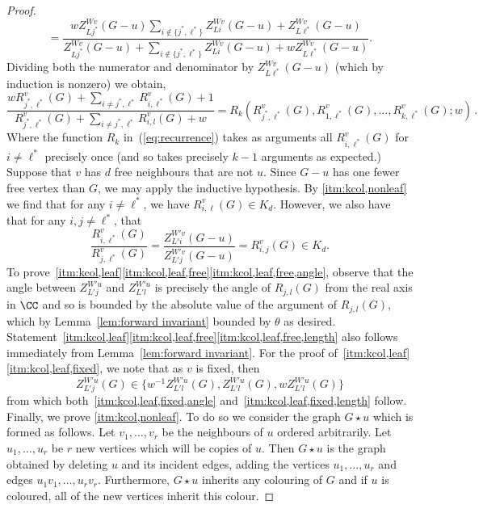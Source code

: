 \begin{proof}
\[ =\frac{wZ^{Wv}_{Lj^*}(G-u)\sum_{i\notin\{ j^*,\ell^*\}}Z^{Wv}_{Li}(G-u)+Z^{Wv}_{L\ell^*}(G-u)}{Z^{Wv}_{Lj^*}(G-u)+\sum_{i\notin\{ j^*,\ell^*\}}Z^{Wv}_{Li}(G-u)+wZ^{Wv}_{L\ell^*}(G-u)}.
 \]
 Dividing both the numerator and denominator by $Z^{Wv}_{L\ell^*}(G-u)$ (which by induction is nonzero) we obtain,
 \begin{equation}
 \dfrac{w R_{j^*,\ell^*}^v(G) + \sum_{i \neq j^*, \ell^*} R_{i,\ell^*}^v(G) +1}{R_{j^*,\ell^*}^v(G) +\sum_{i \neq j^*,\ell^*} R_{i,l}^v(G)+w} = R_k(R_{j^*,\ell^*}^v(G), R_{1,\ell^*}^v(G), \dotsc, R_{k,\ell^*}^v(G);w)\,.
 \label{eq:recurrence}
\end{equation}
Where the function $R_k$ in~(\ref{eq:recurrence}) takes as arguments all $R^v_{i,\ell^*}(G)$ for $i \neq \ell^*$ precisely once (and so takes precisely $k-1$ arguments as expected.)
%
Suppose that $v$ has $d$ free neighbours that are not $u$.
Since $G -u$ has one fewer free vertex than $G$, we may apply the inductive hypothesis.
By \ref{itm:kcol,nonleaf} we find that for any $i\neq \ell^*$, we have $R^v_{i,\ell}(G)\in K_d$.
However, we also have that for any $i,j\neq \ell^*$, that 
\[
\frac{R^v_{i,\ell^*}(G)}{R^v_{j,\ell^*}(G)}=\frac{Z_{L'i}^{W'v}(G- u)}{Z_{L'j}^{W'v}(G- u)}=R^v_{i,j}(G)\in K_d.
\]
To prove~\ref{itm:kcol,leaf}\ref{itm:kcol,leaf,free}\ref{itm:kcol,leaf,free,angle}, observe that the angle between $Z_{L'j}^{W'u}$ and $Z_{L'l}^{W'u}$ is precisely the angle of $R_{j,l}(G)$ from the real axis in $\CC$ and so is bounded by the absolute value of the argument of $R_{j,l}(G)$, which by Lemma~\ref{lem:forward invariant} bounded by $\theta$ as desired.
Statement~\ref{itm:kcol,leaf}\ref{itm:kcol,leaf,free}\ref{itm:kcol,leaf,free,length} also follows immediately from Lemma~\ref{lem:forward invariant}.
%
For the proof of~\ref{itm:kcol,leaf}\ref{itm:kcol,leaf,fixed}, we note that as $v$ is fixed, then 
$$
Z_{L'j}^{W'u}(G) \in \{ w^{-1} Z_{L'l}^{W'u}(G),Z_{L'l}^{W'u}(G),wZ_{L'l}^{W'u}(G) \}
$$
from which both~\ref{itm:kcol,leaf,fixed,angle} and~\ref{itm:kcol,leaf,fixed,length} follow.
%
Finally, we prove \ref{itm:kcol,nonleaf}.
To do so we consider the graph $G \star u$ which is formed as follows.
Let $v_1, \ldots, v_r$ be the neighbours of $u$ ordered arbitrarily.
Let $u_1, \ldots, u_r$ be $r$ new vertices which will be copies of $u$.
Then $G \star u$ is the graph obtained by deleting $u$ and its incident edges, adding the vertices $u_1, \ldots, u_r$ and edges $u_1v_1, \ldots, u_rv_r$.
Furthermore, $G \star u$ inherits any colouring of $G$ and if $u$ is coloured, all of the new vertices inherit this colour.

\end{proof}
